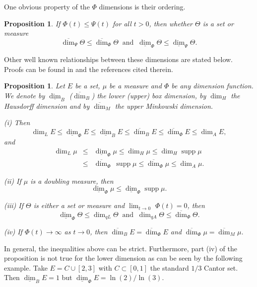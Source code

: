 \documentclass{amsart}
\newtheorem{proposition}[theorem]{Proposition}
\theoremstyle{plain}
\numberwithin{equation}{section}
\DeclareMathOperator{\supp}{supp}
\newcommand{\odim}{\overline{\dim}}
\newcommand{\udim}{\underline{\dim}}
\begin{document}
One obvious property of the $\Phi$ dimensions is their ordering.

\begin{proposition}
If $\Phi (t) \leq \Psi (t)$ for all $t>0$, then whether $\Theta $ is a set or measure
\begin{equation*}
    \odim_{\Psi}\Theta \leq \odim_{\Phi}\Theta \ \text{ and }\  \udim_{\Phi}\Theta \leq \udim_{\Psi}\Theta.
\end{equation*}
\end{proposition}

Other well known relationships between these dimensions are stated below.
Proofs can be found in \cite{FY, GHM, HH} and the references cited therein.

\begin{proposition}
\label{prop:dimensionproperties} 
Let $E$ be a set, $\mu$ be a measure and $\Phi$ be any dimension function. 
We denote by $\udim_{B}$ ($\odim_{B}$) the lower (upper) box dimension, by $\dim_{H}$ the Hausdorff dimension
 and by $\odim_{M}$ the upper Minkowski dimension.

(i) Then
\begin{equation*}
   \dim_{L}E\leq \udim_{\Phi}E\leq \udim_{B}E\leq \odim_{B}E\leq \odim_{\Phi}E\leq \dim_{A}E,
\end{equation*}
  and 
\begin{eqnarray*}
       \dim_{L}\mu &\leq &\udim_{\Phi}\mu \leq \dim_{H}\mu \leq \dim_{H}\supp\mu \\
                    &\leq &\odim_{\Phi}\ \supp\mu \leq \odim_{\Phi}\mu \leq \dim_{A}\mu.
\end{eqnarray*}

(ii) If $\mu$ is a doubling measure, then 
\begin{equation*}
        \udim_{\Phi}\mu \leq \udim_{\Phi}\supp\mu.
\end{equation*}

(iii) If $\Theta$ is either a set or measure and $\lim_{t\rightarrow 0}$ $\Phi (t)=0$, then 
\begin{equation*}
    \udim_{\Phi}\Theta \leq \dim_{qL}\Theta \ \text{ and }\ \dim_{qA}\Theta \leq \odim_{\Phi}\Theta.
\end{equation*}

(iv) If $\Phi (t)\rightarrow \infty$ as $t\rightarrow 0$, then $\odim_{B}E=\odim_{\Phi}E$ and $\odim_{\Phi}\mu =\odim_{M}\mu$.
\end{proposition}

In general, the inequalities above can be strict.
Furthermore, part (iv) of the proposition is not true for the lower dimension as can be seen by the following example.  Take $E = C \cup [2,3]$ with $C \subset [0,1]$ the standard $1/3$ Cantor set.
Then $\udim_B E = 1$ but $\udim_\Phi E = \ln(2)/\ln(3)$.
\end{document}
